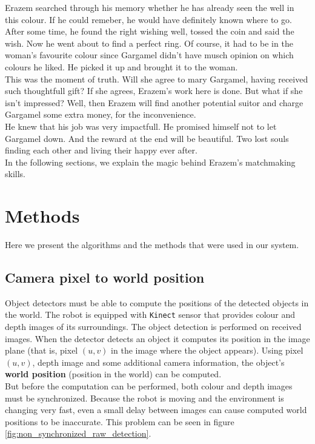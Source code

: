 \documentclass[12pt,a4paper]{article}
\begin{document}
	Erazem searched through his memory whether he has already seen the well in this colour. If he could remeber, he would have definitely known where to go. After some time, he found the right wishing well, tossed the coin and said the wish. Now he went about to find a perfect ring. Of course, it had to be in the woman's favourite colour since Gargamel didn't have musch opinion on which colours he liked. He picked it up and brought it to the woman. \\
	
	This was the moment of truth. Will she agree to mary Gargamel, having received such thoughtfull gift? If she agrees, Erazem's work here is done. But what if she isn't impressed? Well, then Erazem will find another potential suitor and charge Gargamel some extra money, for the inconvenience. \\

	He knew that his job was very impactfull. He promised himself not to let Gargamel down. And the reward at the end will be beautiful. Two lost souls finding each other and living their happy ever after. \\

	In the following sections, we explain the magic behind Erazem's matchmaking skills. \\
	
	\section{Methods} \label{methods}
	Here we present the algorithms and the methods that were used in our system.
	
	\subsection{Camera pixel to world position} \label{pixel_to_world}
	Object detectors must be able to compute the positions of the detected objects in the world. The robot is equipped with \texttt{Kinect} sensor that provides colour and depth images of its surroundings. The object detection is performed on received images. When the detector detects an object it computes its position in the image plane (that is, pixel $(u, v)$ in the image where the object appears). Using pixel $(u, v)$, depth image and some additional camera information, the object's \textbf{world position} (position in the world) can be computed. \\
	
	But before the computation can be performed, both colour and depth images must be synchronized. Because the robot is moving and the environment is changing very fast, even a small delay between images can cause computed world positions to be inaccurate. This problem can be seen in figure \ref{fig:non_synchronized_raw_detection}. \\ 
	
\end{document}
